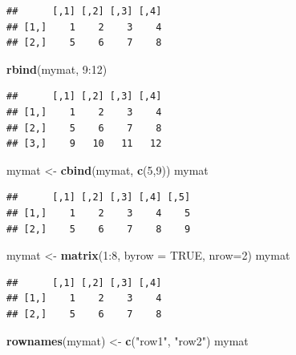 \documentclass[]{book}
\newenvironment{Shaded}{\begin{snugshade}}{\end{snugshade}}
\newcommand{\KeywordTok}[1]{\textcolor[rgb]{0.13,0.29,0.53}{\textbf{{#1}}}}
\newcommand{\DataTypeTok}[1]{\textcolor[rgb]{0.13,0.29,0.53}{{#1}}}
\newcommand{\DecValTok}[1]{\textcolor[rgb]{0.00,0.00,0.81}{{#1}}}
\newcommand{\StringTok}[1]{\textcolor[rgb]{0.31,0.60,0.02}{{#1}}}
\newcommand{\OtherTok}[1]{\textcolor[rgb]{0.56,0.35,0.01}{{#1}}}
\newcommand{\NormalTok}[1]{{#1}}
\begin{document}
\begin{verbatim}
##      [,1] [,2] [,3] [,4]
## [1,]    1    2    3    4
## [2,]    5    6    7    8
\end{verbatim}

\begin{Shaded}
\begin{Highlighting}[]
\KeywordTok{rbind}\NormalTok{(mymat, }\DecValTok{9}\NormalTok{:}\DecValTok{12}\NormalTok{)}
\end{Highlighting}
\end{Shaded}

\begin{verbatim}
##      [,1] [,2] [,3] [,4]
## [1,]    1    2    3    4
## [2,]    5    6    7    8
## [3,]    9   10   11   12
\end{verbatim}

\begin{Shaded}
\begin{Highlighting}[]
\NormalTok{mymat <-}\StringTok{ }\KeywordTok{cbind}\NormalTok{(mymat, }\KeywordTok{c}\NormalTok{(}\DecValTok{5}\NormalTok{,}\DecValTok{9}\NormalTok{))}
\NormalTok{mymat}
\end{Highlighting}
\end{Shaded}

\begin{verbatim}
##      [,1] [,2] [,3] [,4] [,5]
## [1,]    1    2    3    4    5
## [2,]    5    6    7    8    9
\end{verbatim}

\begin{Shaded}
\begin{Highlighting}[]
\NormalTok{mymat  <-}\StringTok{ }\KeywordTok{matrix}\NormalTok{(}\DecValTok{1}\NormalTok{:}\DecValTok{8}\NormalTok{, }\DataTypeTok{byrow =} \OtherTok{TRUE}\NormalTok{, }\DataTypeTok{nrow=}\DecValTok{2}\NormalTok{)}
\NormalTok{mymat}
\end{Highlighting}
\end{Shaded}

\begin{verbatim}
##      [,1] [,2] [,3] [,4]
## [1,]    1    2    3    4
## [2,]    5    6    7    8
\end{verbatim}

\begin{Shaded}
\begin{Highlighting}[]
\KeywordTok{rownames}\NormalTok{(mymat) <-}\StringTok{ }\KeywordTok{c}\NormalTok{(}\StringTok{"row1"}\NormalTok{, }\StringTok{"row2"}\NormalTok{)}
\NormalTok{mymat}
\end{Highlighting}
\end{Shaded}
\end{document}
